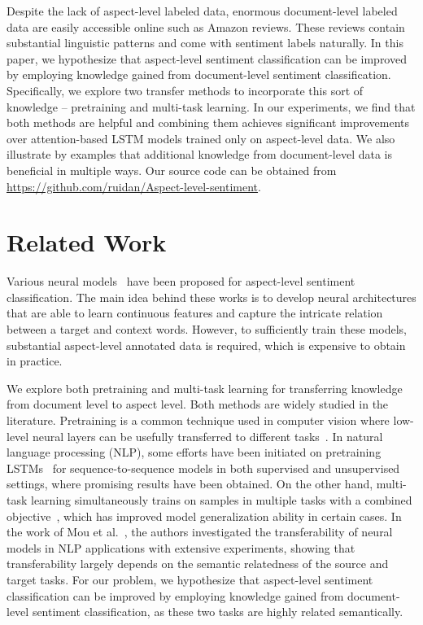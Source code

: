 \documentclass[11pt,a4paper]{article}
\begin{document}
Despite the lack of aspect-level labeled data, enormous document-level labeled data are easily accessible online such as Amazon reviews. These reviews contain substantial linguistic patterns and come with sentiment labels naturally. In this paper,  we hypothesize that aspect-level sentiment classification can be improved by employing knowledge gained from document-level sentiment classification. Specifically, we explore two transfer methods to incorporate this sort of knowledge -- pretraining and multi-task learning. In our experiments, we find that both methods are helpful and combining them achieves significant improvements over attention-based LSTM models trained only on aspect-level data. We also illustrate by examples that additional knowledge from document-level data is beneficial in multiple ways. 
Our source code can be obtained from \url{https://github.com/ruidan/Aspect-level-sentiment}.


\section{Related Work}
Various neural
models~\cite{Dong:14,Nguyen:15,Vo:15,Tang:16a,Tang:16b,Wang:16,zhang:16,Liu:17,Chen:17} have been proposed for aspect-level sentiment classification. The main idea behind these works is to develop neural architectures that are able to learn continuous features and capture the intricate relation between a target and context words. However, to sufficiently train these models, substantial aspect-level annotated data is required, which is expensive to obtain in practice.

We explore both pretraining and multi-task learning for transferring knowledge from document level to aspect level. Both methods are widely studied in the literature. Pretraining is a common technique used in computer vision where low-level neural layers can be usefully transferred to different tasks~\cite{Krizhevsky:12,Zeiler:14}. In natural language processing (NLP), some efforts have been initiated on pretraining LSTMs~\cite{Dai:15,Zoph:16,Prajit:17} for sequence-to-sequence models in both supervised and unsupervised settings, where promising results have been obtained. On the other hand, multi-task learning simultaneously trains on samples in multiple tasks with a combined objective~\cite{Collobert:08,Luong:15a,Liu:16}, which has improved model generalization ability in certain cases. In the work of Mou et al.~, the authors investigated the transferability of neural models in NLP applications with extensive experiments, showing that transferability largely depends on the semantic relatedness of the source and target tasks. For our problem, we hypothesize that aspect-level sentiment classification can be improved by employing knowledge gained from document-level sentiment classification, as these two tasks are highly related semantically.
\end{document}
